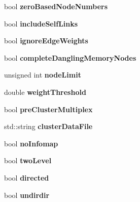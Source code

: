 \begin{DoxyCompactItemize}
\mbox{\label{structConfig_ad30dd710854733e3a70158b3d0b93a9e}} 
bool {\bfseries zero\+Based\+Node\+Numbers}
\item 
\mbox{\label{structConfig_af645e5fc5912fc9c52e09110c5c15c79}} 
bool {\bfseries include\+Self\+Links}
\item 
\mbox{\label{structConfig_a0e4355e2f8ef885ab798656166fdf69c}} 
bool {\bfseries ignore\+Edge\+Weights}
\item 
\mbox{\label{structConfig_a119ba840b30d10cb862a2eba736fceb4}} 
bool {\bfseries complete\+Dangling\+Memory\+Nodes}
\item 
\mbox{\label{structConfig_a13c1157a8f39c0d04722a46371cfef1d}} 
unsigned int {\bfseries node\+Limit}
\item 
\mbox{\label{structConfig_acb78c160afb96476461d56aa378932f1}} 
double {\bfseries weight\+Threshold}
\item 
\mbox{\label{structConfig_a299b469813834ef95bd0a106e7b697cc}} 
bool {\bfseries pre\+Cluster\+Multiplex}
\item 
\mbox{\label{structConfig_a0511c1c6cdaf79550c5d853f0c8348b9}} 
std\+::string {\bfseries cluster\+Data\+File}
\item 
\mbox{\label{structConfig_a58008ab97a6a8617ad430e1bded22859}} 
bool {\bfseries no\+Infomap}
\item 
\mbox{\label{structConfig_aa23f3a69bf9163f8a22ab42f365eba76}} 
bool {\bfseries two\+Level}
\item 
\mbox{\label{structConfig_aadd56cee68c4669b094e5949b788e57d}} 
bool {\bfseries directed}
\item 
\mbox{\label{structConfig_abb6ec252baa1a5cd3d51de027c1731f0}} 
bool {\bfseries undirdir}
\item 
\mbox{\label{structConfig_af6e7a32f9d775c3e19fb16045d12a30a}} 

\end{DoxyCompactItemize}
